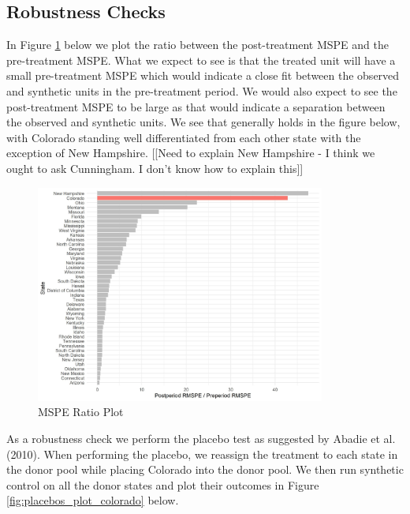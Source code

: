 \documentclass{article}
\begin{document}


\subsection{Robustness Checks}

In Figure \ref{fig:mspe_plot_colorado} below we plot the ratio between the post-treatment MSPE and the pre-treatment MSPE. What we expect to see is that the treated unit will have a small pre-treatment MSPE which would indicate a close fit between the observed and synthetic units in the pre-treatment period. We would also expect to see the post-treatment MSPE to be large as that would indicate a separation between the observed and synthetic units. We see that generally holds in the figure below, with Colorado standing well differentiated from each other state with the exception of New Hampshire. [[Need to explain New Hampshire - I think we ought to ask Cunningham. I don't know how to explain this]]

\begin{figure}[H]
	\begin{center}
		\includegraphics[width=0.85\textwidth]{mspe_plot_colorado}
	\end{center}
	\caption{MSPE Ratio Plot}
	\label{fig:mspe_plot_colorado}
\end{figure}

As a robustness check we perform the placebo test as suggested by Abadie et al. (2010). When performing the placebo, we reassign the treatment to each state in the donor pool while placing Colorado into the donor pool. We then run synthetic control on all the donor states and plot their outcomes in Figure \ref{fig:placebos_plot_colorado} below.
\end{document}
